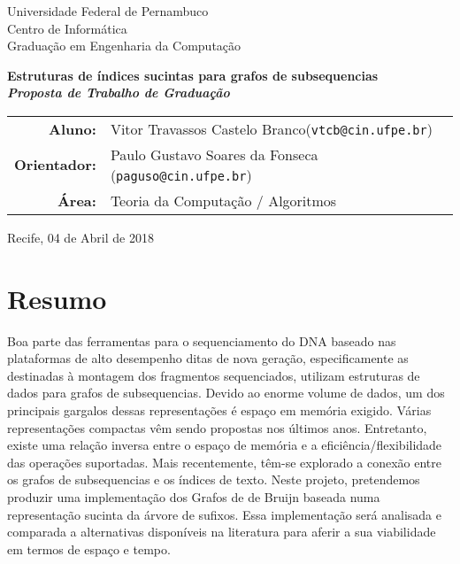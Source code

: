 \documentclass[12pt, a4paper, oneside]{article}
\begin{document}


\thispagestyle{empty}
\begin{center}
\Large
Universidade Federal de Pernambuco\\
Centro de Informática\\
Graduação em Engenharia da Computação

\vfill

{\huge \bfseries Estruturas de índices sucintas para grafos de subsequencias}
\\
\medskip
{\bfseries\itshape Proposta de Trabalho de Graduação}

\vfill

\bigskip

	\begin{tabular}{r p{95mm}}
	\textbf{Aluno: } & Vitor Travassos Castelo Branco\newline(\texttt{vtcb@cin.ufpe.br}) \\ 
\textbf{Orientador: } & Paulo Gustavo Soares da Fonseca \newline(\texttt{paguso@cin.ufpe.br})
\\
	\textbf{Área: } & Teoria da Computação / Algoritmos
\end{tabular}

	\vspace{3cm}
Recife, 04 de Abril de 2018
\end{center}

\clearpage 
\thispagestyle{empty}
\section{Resumo}
Boa parte das ferramentas para o sequenciamento do DNA baseado nas plataformas de alto desempenho ditas de nova geração, especificamente as destinadas à montagem dos fragmentos sequenciados, utilizam estruturas de dados para grafos de subsequencias. Devido ao enorme volume de dados, um dos principais gargalos dessas representações é espaço em memória exigido. Várias representações compactas vêm sendo propostas nos últimos anos. Entretanto, existe uma relação inversa entre o espaço de memória e a eficiência/flexibilidade das operações suportadas. Mais recentemente, têm-se explorado a conexão entre os grafos de subsequencias e os índices de texto. Neste projeto, pretendemos produzir uma implementação dos Grafos de de Bruijn baseada numa representação sucinta da árvore de sufixos. Essa implementação será analisada e comparada a alternativas disponíveis na literatura para aferir a sua viabilidade em termos de espaço e tempo.
\end{document}

